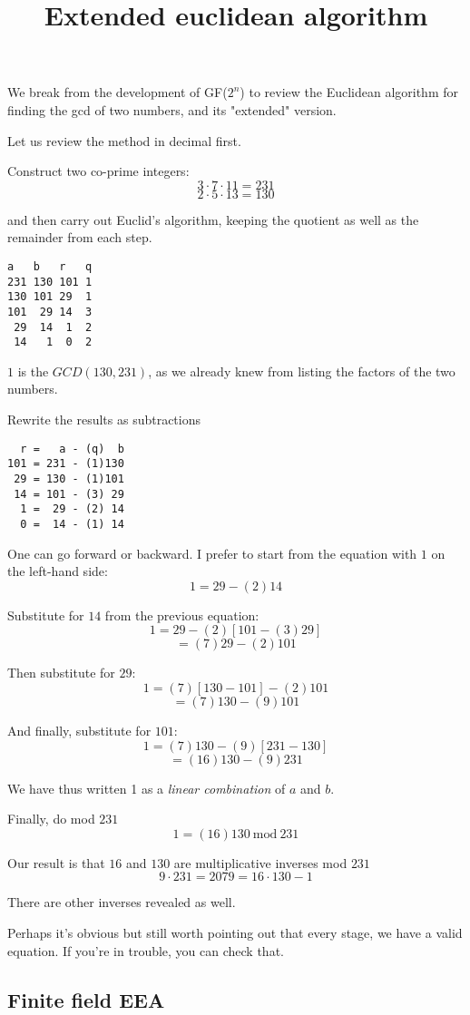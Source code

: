 \documentclass[11pt, oneside]{article}
\title{Extended euclidean algorithm}
\date{}
\begin{document}
\maketitle
\Large
We break from the development of GF($2^n$) to review the Euclidean algorithm for finding the gcd of two numbers, and its "extended" version.

Let us review the method in decimal first.

Construct two co-prime integers:
\[ 3 \cdot 7 \cdot 11 = 231 \]
\[ 2 \cdot 5 \cdot 13 = 130 \]

and then carry out Euclid's algorithm, keeping the quotient as well as the remainder from each step.

\begin{verbatim}
a   b   r   q
231 130 101 1
130 101 29  1
101  29 14  3
 29  14  1  2
 14   1  0  2
\end{verbatim}
$1$ is the $GCD(130,231)$, as we already knew from listing the factors of the two numbers.

Rewrite the results as subtractions

\begin{verbatim}
  r =   a - (q)  b
101 = 231 - (1)130
 29 = 130 - (1)101
 14 = 101 - (3) 29
  1 =  29 - (2) 14
  0 =  14 - (1) 14
\end{verbatim}

One can go forward or backward.  I prefer to start from the equation with $1$ on the left-hand side:
\[ 1 = 29 - (2)14 \]

Substitute for $14$ from the previous equation:
\[ 1 = 29 - (2)[101 - (3)29] \]
\[ = (7)29 - (2)101 \]

Then substitute for $29$:
\[ 1 = (7)[130 - 101] - (2)101 \]
\[ = (7)130 - (9)101 \]

And finally, substitute for $101$:
\[ 1 = (7)130 - (9)[231 - 130] \]
\[  = (16)130 - (9)231 \]

We have thus written 1 as a \emph{linear combination} of $a$ and $b$.  

Finally, do mod $231$
\[ 1 = (16)130\ \text{mod}\ 231 \]

Our result is that $16$ and $130$ are multiplicative inverses mod $231$
\[ 9 \cdot 231 = 2079 = 16 \cdot 130 - 1 \]

There are other inverses revealed as well.

Perhaps it's obvious but still worth pointing out that every stage, we have a valid equation.  If you're in trouble, you can check that.

\subsection*{Finite field EEA}
\end{document}
